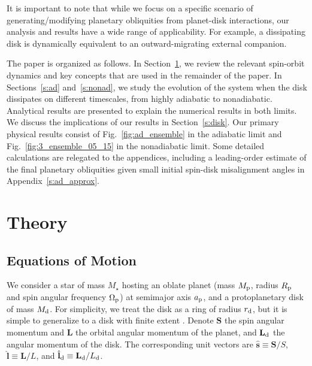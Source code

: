 \documentclass[twocolumn,twocolappendix]{aastex63}
\newcommand*{\bsmb}[1]{\boldsymbol{\mathbf{#1}}}
\newcommand*{\uv}[1]{\hat{\bsmb{#1}}}
\begin{document}
It is important to note that while we focus on a specific scenario of
generating/modifying planetary obliquities from planet-disk interactions, our
analysis and results have a wide range of applicability. For example, a
dissipating disk is dynamically equivalent to an outward-migrating external
companion.

The paper is organized as follows. In Section~\ref{s:eq}, we review the relevant
spin-orbit dynamics and key concepts that are used in the remainder of the
paper. In Sections~\ref{s:ad} and~\ref{s:nonad}, we study the evolution of the
system when the disk dissipates on different timescales, from highly adiabatic
to nonadiabatic. Analytical results are presented to explain the numerical
results in both limits. We discuss the implications of our results in
Section~\ref{s:disk}. Our primary physical results consist of
Fig.~\ref{fig:ad_ensemble} in the adiabatic limit and
Fig.~\ref{fig:3_ensemble_05_15} in the nonadiabatic limit. Some detailed
calculations are relegated to the appendices, including a leading-order
estimate of the final planetary obliquities given small initial spin-disk
misalignment angles in Appendix~\ref{s:ad_approx}.

\section{Theory}\label{s:eq}

\subsection{Equations of Motion}

We consider a star of mass $M_\star$ hosting an oblate planet (mass $M_{\rm p}$,
radius $R_{\rm p}$ and spin angular frequency $\Omega_{\rm p}$) at semimajor
axis $a_{\rm p}$, and a protoplanetary disk of mass $M_{\rm d}$. For simplicity,
we treat the disk as a ring of radius $r_{\rm d}$, but it is simple to
generalize to a disk with finite extent \citep[see][]{millholland_disk}. Denote
$\bsmb{S}$ the spin angular momentum and $\bsmb{L}$ the orbital angular momentum of
the planet, and $\bsmb{L}_{\rm d}$ the angular momentum of the disk. The
corresponding unit vectors are $\uv{s} \equiv \bsmb{S} / S$, $\uv{l} \equiv \bsmb{L}
/ L$, and $\uv{l}_{\rm d} \equiv \bsmb{L}_{\rm d} / L_{\rm d}$.
\end{document}
